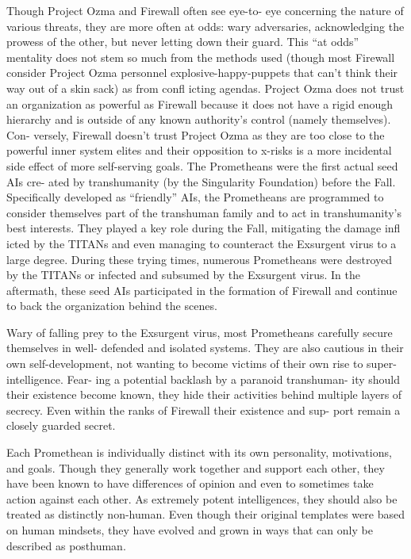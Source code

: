 Though Project Ozma and Firewall often see eye-to-
eye concerning the nature of various threats, they are 
more often at odds: wary adversaries, acknowledging 
the prowess of the other, but never letting down their 
guard. This ``at odds'' mentality does not stem so much 
from the methods used (though most Firewall consider 
Project Ozma personnel explosive-happy-puppets that 
can't think their way out of a skin sack) as from 
confl icting agendas. Project Ozma does not trust an 
organization as powerful as Firewall because it does 
not have a rigid enough hierarchy and is outside of any 
known authority's control (namely themselves). Con-
versely, Firewall doesn't trust Project Ozma as they are 
too close to the powerful inner system elites and their 
opposition to x-risks is a more incidental side effect of 
more self-serving goals.
The Prometheans were the first actual seed AIs cre-
ated by transhumanity (by the Singularity Foundation) 
before the Fall. Specifically developed as ``friendly'' 
AIs, the Prometheans are programmed to consider 
themselves part of the transhuman family and to act 
in transhumanity's best interests. They played a key 
role during the Fall, mitigating the damage infl icted 
by the TITANs and even managing to counteract the 
Exsurgent virus to a large degree. During these trying 
times, numerous Prometheans were destroyed by the 
TITANs or infected and subsumed by the Exsurgent 
virus. In the aftermath, these seed AIs participated in 
the formation of Firewall and continue to back the 
organization behind the scenes.

Wary of falling prey to the Exsurgent virus, most 
Prometheans carefully secure themselves in well-
defended and isolated systems. They are also cautious 
in their own self-development, not wanting to become 
victims of their own rise to super-intelligence. Fear-
ing a potential backlash by a paranoid transhuman-
ity should their existence become known, they hide 
their activities behind multiple layers of secrecy. Even 
within the ranks of Firewall their existence and sup-
port remain a closely guarded secret.

Each Promethean is individually distinct with its 
own personality, motivations, and goals. Though they 
generally work together and support each other, they 
have been known to have differences of opinion and 
even to sometimes take action against each other. As 
extremely potent intelligences, they should also be 
treated as distinctly non-human. Even though their 
original templates were based on human mindsets, 
they have evolved and grown in ways that can only 
be described as posthuman. 

